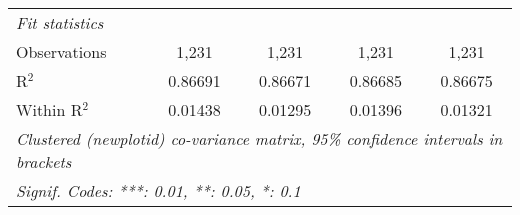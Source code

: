 \begin{table}[htbp]
\begin{tabular}{lcccc}
      \midrule
      \emph{Fit statistics}\\
      Observations                                     & 1,231              & 1,231              & 1,231             & 1,231\\  
      R$^2$                                            & 0.86691            & 0.86671            & 0.86685           & 0.86675\\  
      Within R$^2$                                     & 0.01438            & 0.01295            & 0.01396           & 0.01321\\  
      \midrule \midrule
      \multicolumn{5}{l}{\emph{Clustered (newplotid) co-variance matrix, 95\% confidence intervals in brackets}}\\
      \multicolumn{5}{l}{\emph{Signif. Codes: ***: 0.01, **: 0.05, *: 0.1}}\\
   \end{tabular}
\end{table}


